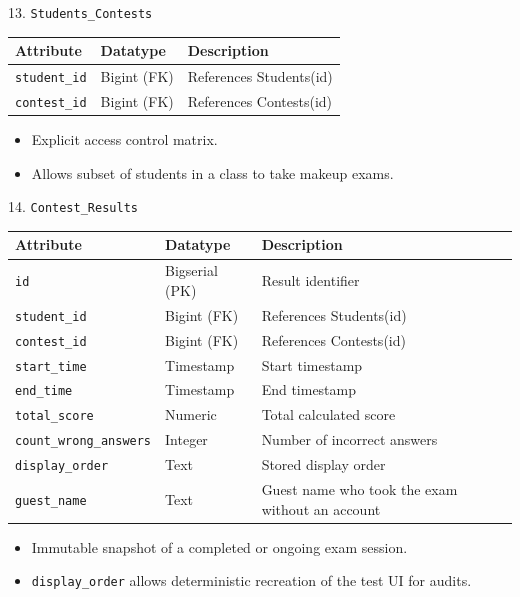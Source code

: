 \documentclass[aspectratio=169, 10pt]{beamer}
\begin{document}
\begin{frame}{13. \texttt{Students\_Contests}}
    \centering
    \small
    \begin{tabular}{|l|l|p{8cm}|}
        \hline
        \textbf{Attribute} & \textbf{Datatype} & \textbf{Description} \\ \hline
        \texttt{student\_id} & Bigint (FK) & References Students(id)\\ \hline
        \texttt{contest\_id} & Bigint (FK) & References Contests(id)\\ \hline
    \end{tabular}
    \vspace{0.3cm}
    \begin{itemize}
        \item Explicit access control matrix.
        \item Allows subset of students in a class to take makeup exams.
    \end{itemize}
\end{frame}


\begin{frame}{14. \texttt{Contest\_Results}}
    \centering
    \footnotesize
    \begin{tabular}{|l|l|p{8cm}|}
        \hline
        \textbf{Attribute} & \textbf{Datatype} & \textbf{Description} \\ \hline
        \texttt{id} & Bigserial (PK) & Result identifier\\ \hline
        \texttt{student\_id} & Bigint (FK) & References Students(id)\\ \hline
        \texttt{contest\_id} & Bigint (FK) & References Contests(id)\\ \hline
        \texttt{start\_time} & Timestamp & Start timestamp\\ \hline
        \texttt{end\_time} & Timestamp & End timestamp\\ \hline
        \texttt{total\_score} & Numeric & Total calculated score\\ \hline
        \texttt{count\_wrong\_answers}& Integer & Number of incorrect answers\\ \hline
        \texttt{display\_order} & Text & Stored display order\\ \hline
        \texttt{guest\_name} & Text & Guest name who took the exam without an account\\ \hline
    \end{tabular}
    \vspace{0.3cm}
    \begin{itemize}
        \item Immutable snapshot of a completed or ongoing exam session.
        \item \texttt{display\_order} allows deterministic recreation of the test UI for audits.
    \end{itemize}
\end{frame}
\end{document}
